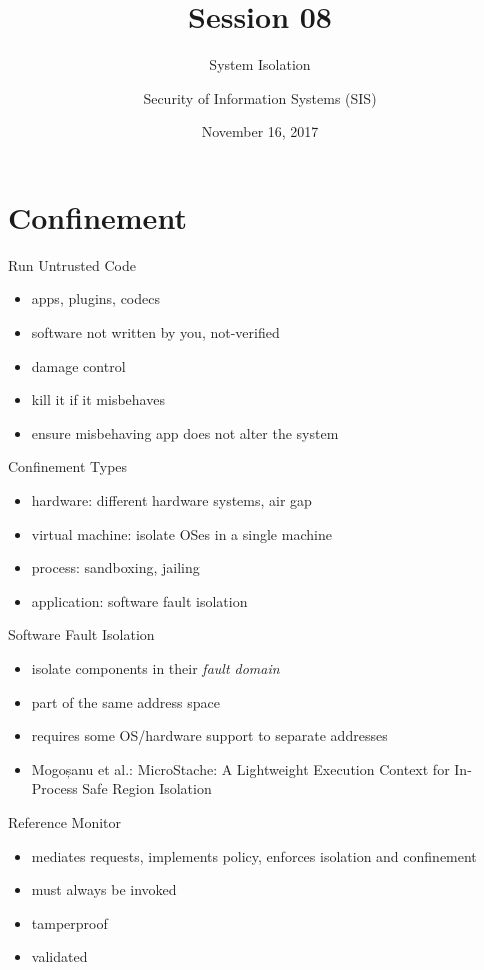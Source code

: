 \documentclass{curs}
\title[Session 08]{Session 08}
\subtitle{System Isolation}
\author{Security of Information Systems (SIS)}
\date{November 16, 2017}
\begin{document}
\frame{\titlepage}

\section{Confinement}

\begin{frame}{Run Untrusted Code}
  \begin{itemize}
    \item apps, plugins, codecs
    \item software not written by you, not-verified
    \item damage control
    \item kill it if it misbehaves
    \item ensure misbehaving app does not alter the system
  \end{itemize}
\end{frame}

\begin{frame}{Confinement Types}
  \begin{itemize}
    \item hardware: different hardware systems, air gap
    \item virtual machine: isolate OSes in a single machine
    \item process: sandboxing, jailing
    \item application: software fault isolation
  \end{itemize}
\end{frame}

\begin{frame}{Software Fault Isolation}
  \begin{itemize}
    \item isolate components in their \textit{fault domain}
    \item part of the same address space
    \item requires some OS/hardware support to separate addresses
    \item Mogoșanu et al.: MicroStache: A Lightweight Execution Context for In-Process Safe Region Isolation
  \end{itemize}
\end{frame}

\begin{frame}{Reference Monitor}
  \begin{itemize}
    \item mediates requests, implements policy, enforces isolation and confinement
    \item must always be invoked
    \item tamperproof
    \item validated
  \end{itemize}
\end{frame}
\end{document}

